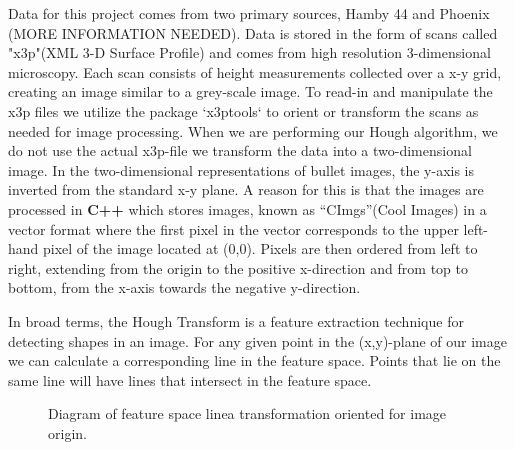 \documentclass[12pt]{article}\usepackage[]{graphicx}\usepackage[]{color}
\theoremstyle{nonumberplain}
\begin{document}
  Data for this project comes from two primary sources, Hamby 44  and Phoenix (MORE INFORMATION NEEDED). Data is stored in the form of scans called "x3p"(XML 3-D Surface Profile) and comes from high resolution 3-dimensional microscopy. Each scan consists of height measurements collected over a x-y grid, creating an image similar to a grey-scale image. To read-in and manipulate the x3p files we utilize the package `x3ptools` to orient or transform the scans as needed for image processing. When we are performing our Hough algorithm, we do not use the actual x3p-file we transform the data into a two-dimensional image. In the two-dimensional representations of bullet images, the y-axis is inverted from the standard x-y plane. A reason for this is that the images are processed in \textbf{C++} which stores images, known as ``CImgs''(Cool Images) in a vector format where the first pixel in the vector corresponds to the upper left-hand pixel of the image located at (0,0). Pixels are then ordered from left to right, extending from the origin to the positive x-direction and from top to bottom, from the x-axis towards the negative y-direction.

In broad terms, the Hough Transform is a feature extraction technique for detecting shapes in an image. For any given point in the (x,y)-plane of our image we can calculate a corresponding line in the feature space. Points that lie on the same line will have lines that intersect in the feature space. 
\begin{figure}[!ht]
\begin{subfigure}{.5\textwidth}
\centering
{}
\label{fig: tikz1}
\end{subfigure}
\begin{subfigure}{.5\textwidth}
\centering
{}
\label{fig: tikz2}
\end{subfigure}
\caption{Diagram of feature space linea transformation oriented for image origin.}
\label{fig: parametrization}
\end{figure}
\end{document}
